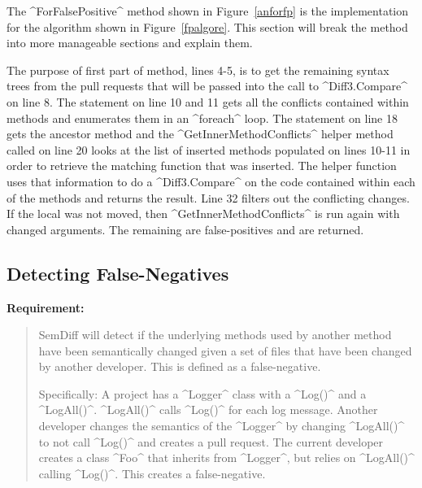 \documentclass[draftclsnofoot,onecolumn]{IEEEtran}
\begin{document}

The ^ForFalsePositive^ method shown in Figure~\ref{anforfp} is the implementation for the algorithm shown in Figure~\ref{fpalgore}. This section will break the method into more manageable sections and explain them.

The purpose of first part of method, lines 4-5, is to get the remaining syntax trees from the pull requests that will be passed into the call to ^Diff3.Compare^ on line 8. The statement on line 10 and 11 gets all the conflicts contained within methods and enumerates them in an ^foreach^ loop. The statement on line 18 gets the ancestor method and the ^GetInnerMethodConflicts^ helper method called on line 20 looks at the list of inserted methods populated on lines 10-11 in order to retrieve the matching function that was inserted. The helper function uses that information to do a ^Diff3.Compare^ on the code contained within each of the methods and returns the result. Line 32 filters out the conflicting changes. If the local was not moved, then ^GetInnerMethodConflicts^ is run again with changed arguments. The remaining are false-positives and are returned.

\subsection{Detecting False-Negatives}%

\textbf{Requirement:}

\begin{quote}

SemDiff will detect if the underlying methods used by another method have been semantically changed given a set of files that have been changed by another developer. This is defined as a false-negative. 

Specifically: A project has a ^Logger^ class with a ^Log()^ and a ^LogAll()^. ^LogAll()^ calls ^Log()^ for each log message. Another developer changes the semantics of the ^Logger^ by changing ^LogAll()^ to not call ^Log()^ and creates a pull request. The current developer creates a class ^Foo^ that inherits from ^Logger^, but relies on ^LogAll()^ calling ^Log()^. This creates a false-negative.

\end{quote}
\end{document}
